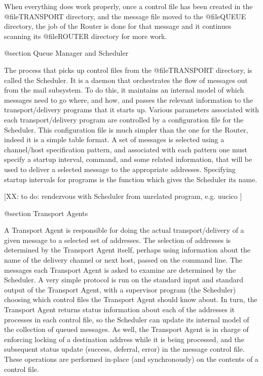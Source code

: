 When everything does work properly, once a control file has been
created in the @file{TRANSPORT} directory, and the message file
moved to the @file{QUEUE} directory, the job of the Router is
done for that message and it continues scanning its @file{ROUTER}
directory for more work.

@section Queue Manager and Scheduler

The process that picks up control files from the @file{TRANSPORT}
directory, is called the Scheduler.
It is a daemon that orchestrates the flow of messages out from
the mail subsystem.
To do this, it maintains an internal model of which messages need
to go where, and how, and passes the relevant information to
the transport/delivery programs that it starts up.
Various parameters associated with each transport/delivery program
are controlled by a configuration file for the Scheduler.
This configuration file is much simpler than the one for the Router,
indeed it is a simple table format.
A set of messages is selected using a channel/host specification
pattern, and associated with each pattern one must specify a startup
interval, command, and some related information, that will be used
to deliver a selected message to the appropriate addresses.
Specifying startup intervals for programs is the function which gives
the Scheduler its name.


[XX: to do: rendezvous with Scheduler from unrelated program, e.g. uucico ]

@section Transport Agents

A Transport Agent is responsible for doing the actual transport/delivery
of a given message to a selected set of addresses.
The selection of addresses is determined by the Transport Agent itself,
perhaps using information about the name of the delivery channel or
next host, passed on the command line.
The messages each Transport Agent is asked to examine are determined
by the Scheduler.
A very simple protocol is run on the standard input and standard output
of the Transport Agent, with a supervisor program (the Scheduler)
choosing which control files the Transport Agent should know about.
In turn, the Transport Agent returns status information about each
of the addresses it processes in each control file, so the Scheduler
can update its internal model of the collection of queued messages.
As well, the Transport Agent is in charge of enforcing locking of a
destination address while it is being processed, and the subsequent
status update (success, deferral, error) in the message control file.
These operations are performed in-place (and synchronously) on the
contents of a control file.

